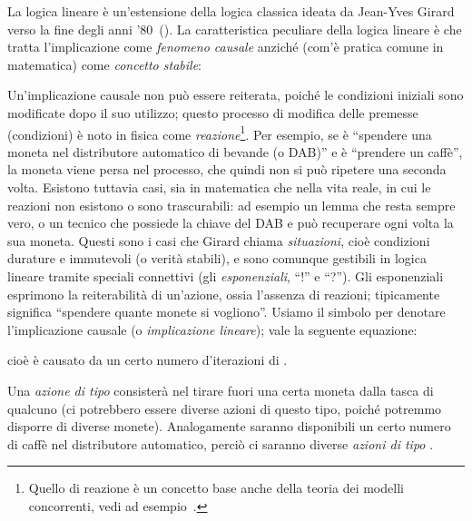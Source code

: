 \documentclass[12pt,a4paper,openright,twoside]{report}
\begin{document}
La logica lineare \`e un'estensione della logica classica ideata da Jean-Yves Girard verso la fine degli anni '80~(\cite{Gir87, GirLafTay89, Gir95}). La caratteristica peculiare della logica lineare \`e che tratta l'implicazione come \emph{fenomeno causale} anzich\'e (com'\`e pratica comune in matematica) come \emph{concetto stabile}:

Un'implicazione causale non pu\`o essere reiterata, poich\'e le condizioni iniziali sono modificate dopo il suo utilizzo; questo processo di modifica delle premesse (condizioni) \`e noto in fisica come \emph{reazione}\footnote{Quello di reazione \`e un concetto base anche della teoria dei modelli concorrenti, vedi ad esempio~\cite{Mil92, SanWal01}.}. Per esempio, se  \`e ``spendere una moneta nel distributore automatico di bevande (o DAB)'' e  \`e ``prendere un caff\`e'', la moneta viene persa nel processo, che quindi non si pu\`o ripetere una seconda volta. Esistono tuttavia casi, sia in matematica che nella vita reale, in cui le reazioni non esistono o sono trascurabili: ad esempio un lemma che resta sempre vero, o un tecnico che possiede la chiave del DAB e pu\`o recuperare ogni volta la sua moneta. Questi sono i casi che Girard chiama \emph{situazioni}, cio\`e condizioni durature e immutevoli (o {verit\`a stabili}), e sono comunque gestibili in logica lineare tramite speciali connettivi (gli \emph{esponenziali}, ``!'' e ``?''). Gli esponenziali esprimono la reiterabilit\`a di un'azione, ossia l'assenza di reazioni; tipicamente  significa ``spendere quante monete si vogliono''. Usiamo il simbolo  per denotare l'implicazione causale (o \emph{implicazione lineare}); vale la seguente equazione:

cio\`e  \`e causato da un certo numero d'iterazioni di .

Una \emph{azione di tipo } consister\`a nel tirare fuori una certa moneta dalla tasca di qualcuno (ci potrebbero essere diverse azioni di questo tipo, poich\'e potremmo disporre di diverse monete). Analogamente saranno disponibili un certo numero di caff\`e nel distributore automatico, perci\`o ci saranno diverse \emph{azioni di tipo }.
\end{document}
